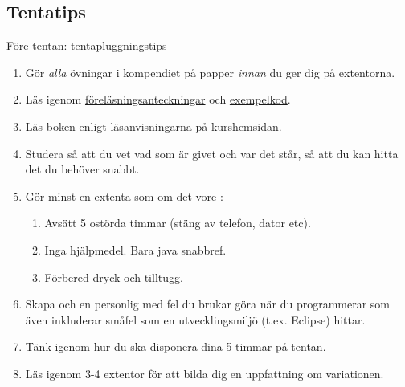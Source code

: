 \documentclass{lecturenotes}
\begin{document}
\subsection{Tentatips}
\begin{Slide}{Före tentan: tentapluggningstips}\footnotesize
\begin{enumerate}
\item Gör \emph{alla} övningar i kompendiet på papper \emph{innan} du ger dig på extentorna. 
\item Läs igenom \href{https://github.com/bjornregnell/lth-eda016-2015/tree/master/lectures/notes}{föreläsningsanteckningar} och \href{https://github.com/bjornregnell/lth-eda016-2015/tree/master/lectures/examples/eclipse-ws/lecture-examples/src}{exempelkod}.
\item Läs boken enligt  \href{http://cs.lth.se/eda016/foerelaesningar-2015/}{läsanvisningarna} på kurshemsidan.
\item Studera   så att du vet vad som är givet och var det står, så att du kan hitta det du behöver snabbt.
\item Gör minst en extenta som om det vore : 
\begin{enumerate}\footnotesize
\item Avsätt 5 ostörda timmar (stäng av telefon, dator etc).
\item Inga hjälpmedel. Bara java snabbref.
\item Förbered dryck och tilltugg.
\end{enumerate}
\item Skapa och  en personlig  med fel du brukar göra när du programmerar som även inkluderar småfel som en utvecklingsmiljö (t.ex. Eclipse) hittar.
\item Tänk igenom hur du ska disponera dina 5 timmar på tentan.
\item Läs igenom 3-4 extentor för att bilda dig en uppfattning om variationen.
\end{enumerate}
\end{Slide}
\end{document}
